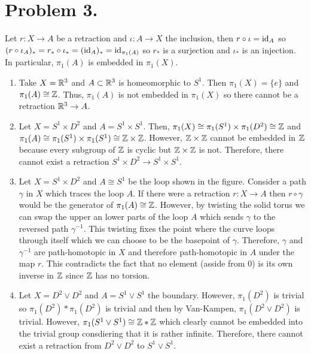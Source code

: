 \documentclass[12pt]{extarticle}
\begin{document}
\section*{Problem 3.}   
Let $r : X \to A$ be a retraction and $\iota : A \to X$ the inclusion, then $r \circ \iota = \mathrm{id}_A$ so $(r \circ \iota_A)_* = r_* \circ \iota_* = (\mathrm{id}_A)_* = \mathrm{id}_{\pi_1(A)}$ so $r_*$ is a surjection and $\iota_*$ is an injection. In particular, $\pi_1(A)$ is embedded in $\pi_1(X)$.
\begin{enumerate}
\item Take $X = \mathbb{R}^3$ and $A \subset \mathbb{R}^3$ is homeomorphic to $S^1$. Then $\pi_1(X) = \{e\}$ and $\pi_1(A) \cong \mathbb{Z}$. Thus, $\pi_1(A)$ is not embedded in $\pi_1(X)$ so there cannot be a retraction $\mathbb{R}^3 \to A$. 

\item Let $X = S^1 \times D^2$ and $A = S^1 \times S^1$. Then, $\pi_1(X) \cong \pi_1(S^1) \times \pi_1(D^2) \cong \mathbb{Z}$ and $\pi_1(A) \cong \pi_1(S^1) \times \pi_1(S^1) \cong \mathbb{Z} \times \mathbb{Z}$. However, $\mathbb{Z} \times \mathbb{Z}$ cannot be embedded in $\mathbb{Z}$ because every subgroup of $\mathbb{Z}$ is cyclic but $\mathbb{Z} \times \mathbb{Z}$ is not. Therefore, there cannot exist a retraction $S^1 \times D^2 \to S^1 \times S^1$. 

\item Let $X = S^1 \times D^2$ and $A \cong S^1$ be the loop shown in the figure. Consider a path $\gamma$ in $X$ which traces the loop $A$. If there were a retraction $r : X \to A$ then $r \circ \gamma$ would be the generator of $\pi_1(A) \cong \mathbb{Z}$. However, by twisting the solid torus we can swap the upper an lower parts of the loop $A$ which sends $\gamma$ to the reversed path $\gamma^{-1}$. This twisting fixes the point where the curve loops through itself which we can choose to be the basepoint of $\gamma$. Therefore, $\gamma$ and $\gamma^{-1}$ are path-homotopic in $X$ and therefore path-homotopic in $A$ under the map $r$. This contradicts the fact that no element (asside from 0) is its own inverse in $\mathbb{Z}$ since $\mathbb{Z}$ has no torsion.  

\item Let $X = D^2 \vee D^2$ and $A = S^1 \vee S^1$ the boundary. However, $\pi_1(D^2)$ is trivial so $\pi_1(D^2) * \pi_1(D^2)$ is trivial and then by Van-Kampen, $\pi_1(D^2 \vee D^2)$ is trivial. However, $\pi_1(S^1 \vee S^1) \cong \mathbb{Z} * \mathbb{Z}$ which clearly cannot be embedded into the trivial group consdiering that it is rather infinite. Therefore, there cannot exist a retraction from $D^2 \vee D^2$ to $S^1 \vee S^1$. 


\end{enumerate}
\end{document}
